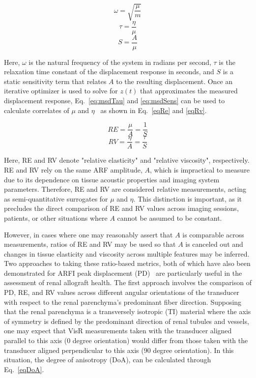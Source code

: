 \begin{equation}
    \omega = \sqrt{ \frac{\mu}{m} }
    \label{eq:msdOmega}
\end{equation}
\begin{equation}
    \tau = \frac{\eta}{\mu}
    \label{eq:msdTau}
\end{equation}
\begin{equation}
    S = \frac{A}{\mu}
    \label{eq:msdSens}
\end{equation}

\noindent{}Here, $\omega$ is the natural frequency of the system in radians per second, $\tau$ is the relaxation time constant of the displacement response in seconds, and $S$ is a static sensitivity term that relates $A$ to the resulting displacement. Once an iterative optimizer is used to solve for $z(t)$ that approximates the measured displacement response, Eq.~\ref{eq:msdTau} and \ref{eq:msdSens} can be used to calculate correlates of $\mu$ and $\eta$~\cite{hossain_Viscoelastic_2020} as shown in Eq.~\ref{eqRe} and \ref{eqRv}.

\begin{equation}
    {RE} = \frac{\mu}{A} = \frac{1}{S}
    \label{eqRe}
\end{equation}
\begin{equation}
    {RV} = \frac{\eta}{A} = \frac{\tau}{S}
    \label{eqRv}
\end{equation}

\noindent{}Here, RE and RV denote "relative elasticity" and "relative viscosity", respectively. RE and RV rely on the same ARF amplitude, $A$, which is impractical to measure due to its dependence on tissue acoustic properties and imaging system parameters. Therefore, RE and RV are considered relative measurements, acting as semi-quantitative surrogates for $\mu$ and $\eta$. This distinction is important, as it precludes the direct comparison of RE and RV values across imaging sessions, patients, or other situations where $A$ cannot be assumed to be constant.

However, in cases where one may reasonably assert that $A$ is comparable across measurements, ratios of RE and RV may be used so that $A$ is canceled out and changes in tissue elasticity and viscosity across multiple features may be inferred. Two approaches to taking these ratio-based metrics, both of which have also been demonstrated for ARFI peak displacement (PD)~\cite{hossain_Viscoelastic_2018,hossain_Quantitative_2022} are particularly useful in the assessment of renal allograft health. The first approach involves the comparison of PD, RE, and RV values across different angular orientations of the transducer with respect to the renal parenchyma's predominant fiber direction. Supposing that the renal parenchyma is a transversely isotropic (TI) material where the axis of symmetry is defined by the predominant direction of renal tubules and vessels, one may expect that VisR measurements taken with the transducer aligned parallel to this axis (0 degree orientation) would differ from those taken with the transducer aligned perpendicular to this axis (90 degree orientation). In this situation, the degree of anisotropy (DoA), can be calculated through Eq.~\ref{eqDoA}.

